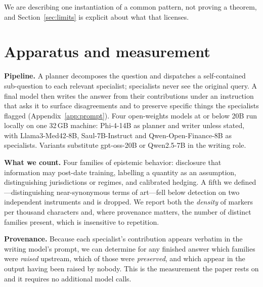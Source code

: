 \documentclass[11pt]{article}
\begin{document}
We are describing one instantiation of a common pattern, not proving a
theorem, and Section~\ref{sec:limits} is explicit about what that licenses.

\section{Apparatus and measurement}
\textbf{Pipeline.} A planner decomposes the question and dispatches a
self-contained sub-question to each relevant specialist; specialists never see
the original query. A final model then writes the answer from their
contributions under an instruction that asks it to surface disagreements and
to preserve specific things the specialists flagged (Appendix~\ref{app:prompt}).
Four open-weights models at or below 20B run locally on one 32\,GB machine:
Phi-4-14B as planner and writer unless stated, with Llama3-Med42-8B,
Saul-7B-Instruct and Qwen-Open-Finance-8B as specialists. Variants substitute
gpt-oss-20B or Qwen2.5-7B in the writing role.

\textbf{What we count.} Four families of epistemic behavior: disclosure that
information may post-date training, labelling a quantity as an assumption,
distinguishing jurisdictions or regimes, and calibrated hedging. A fifth we
defined---distinguishing near-synonymous terms of art---fell below detection on
two independent instruments and is dropped. We report both the \emph{density}
of markers per thousand characters and, where provenance matters, the number of
distinct families present, which is insensitive to repetition.

\textbf{Provenance.} Because each specialist's contribution appears verbatim in
the writing model's prompt, we can determine for any finished answer which
families were \emph{raised} upstream, which of those were \emph{preserved},
and which appear in the output having been raised by nobody. This is the
measurement the paper rests on and it requires no additional model calls.
\end{document}
